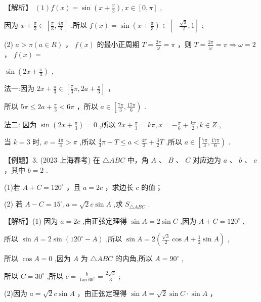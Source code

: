 \documentclass[10pt]{article}
\begin{document}
【解析】 \(\left( 1\right) f\left( x\right)  = \sin \left( {x + \frac{\pi }{3}}\right) ,x \in  \left\lbrack  {0,\pi }\right\rbrack\) ,

因为 \(x + \frac{\pi }{3} \in  \left\lbrack  {\frac{\pi }{3},\frac{4\pi }{3}}\right\rbrack\) ,所以 \(f\left( x\right)  = \sin \left( {x + \frac{\pi }{3}}\right)  \in  \left\lbrack  {-\frac{\sqrt{3}}{2},1}\right\rbrack\) ;

(2) \(a > \pi \left( {a \in  R}\right)\) ， \(f\left( x\right)\) 的最小正周期 \(T = \frac{2\pi }{\omega } = \pi\) ，则 \(T = \frac{2\pi }{\omega } = \pi  \Rightarrow  \omega  = 2\) ， \(f\left( x\right)  =\)

\(\sin \left( {{2x} + \frac{\pi }{3}}\right)\) ,

法一:因为 \({2x} + \frac{\pi }{3} \in  \left\lbrack  {\frac{7}{3}\pi ,{2a} + \frac{\pi }{3}}\right\rbrack\) ，

所以 \({5\pi } \leq  {2a} + \frac{\pi }{3} < {6\pi }\) ，所以 \(a \in  \left\lbrack  {\frac{7\pi }{3},\frac{17\pi }{6}}\right)\) .

法二: 因为 \(\sin \left( {{2x} + \frac{\pi }{3}}\right)  = 0\) ,所以 \({2x} + \frac{\pi }{3} = {k\pi },x =  - \frac{\pi }{6} + \frac{k\pi }{2},k \in  Z\) ,

当 \(k = 3\) 时, \(x = \frac{4\pi }{3} > \pi\) ,所以 \(\frac{4}{3}\pi  + T \leq  a < \frac{4\pi }{3} + \frac{3}{2}T\) ,所以 \(a \in  \left\lbrack  {\frac{7\pi }{3},\frac{17\pi }{6}}\right)\) .

【例题】3. (2023 上海春考) 在 \(\bigtriangleup  {ABC}\) 中，角 \(A\) 、 \(B\) 、 \(C\) 对应边为 \(a\) 、 \(b\) 、 \(c\) ，其中 \(b = 2\) .

(1)若 \(A + C = {120}^{ \circ  }\) ，且 \(a = {2c}\) ，求边长 \(c\) 的值；

(2) 若 \(A - C = {15}^{ \circ  },a = \sqrt{2}c\sin A\) ,求 \({S}_{\bigtriangleup {ABC}}\) .

【解析】(1) 因为 \(a = {2c}\) ,由正弦定理得 \(\sin A = 2\sin C\) ,因为 \(A + C = {120}^{ \circ  }\) ,

所以 \(\sin A = 2\sin \left( {{120}^{ \circ  } - A}\right)\) ,所以 \(\sin A = 2\left( {\frac{\sqrt{3}}{2}\cos A + \frac{1}{2}\sin A}\right)\) ,

所以 \(\cos A = 0\) ,因为 \(A\) 为 \(\bigtriangleup {ABC}\) 的内角,所以 \(A = {90}^{ \circ  }\) ,

所以 \(C = {30}^{ \circ  }\) ,所以 \(c = \frac{b}{\tan {60}^{ \circ  }} = \frac{2\sqrt{3}}{3}\) ;

(2)因为 \(a = \sqrt{2}c\sin A\) ，由正弦定理得 \(\sin A = \sqrt{2}\sin C \cdot  \sin A\) ，
\end{document}
